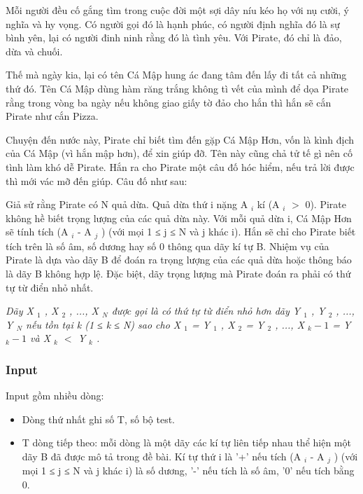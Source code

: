 



   Mỗi người đều cố gắng tìm trong cuộc đời một sợi dây níu kéo họ với nụ cười, ý nghĩa và hy vọng. Có người gọi đó là hạnh phúc, có người định nghĩa đó là sự bình yên, lại có người đinh ninh rằng đó là tình yêu. Với Pirate, đó chỉ là đảo, dừa và chuối.  

   Thế mà ngày kia, lại có tên Cá Mập hung ác đang tâm đến lấy đi tất cả những thứ đó. Tên Cá Mập dùng hàm răng trắng không tì vết của mình để dọa Pirate rằng trong vòng ba ngày nếu không giao giấy tờ đảo cho hắn thì hắn sẽ cắn Pirate như cắn Pizza.  

   Chuyện đến nước này, Pirate chỉ biết tìm đến gặp Cá Mập Hơn, vốn là kình địch của Cá Mập (vì hắn mập hơn), để xin giúp đỡ. Tên này cũng chả tử tế gì nên cố tình làm khó dễ Pirate. Hắn ra cho Pirate một câu đố hóc hiểm, nếu trả lời được thì mới vác mỡ đến giúp. Câu đố như sau:  

   Giả sử rằng Pirate có N quả dừa. Quả dừa thứ i nặng A   $_    i   $   kí (A   $_    i   $   $>$ 0). Pirate không hề biết trọng lượng của các quả dừa này. Với mỗi quả dừa i, Cá Mập Hơn sẽ tính tích (A   $_    i   $   - A   $_    j   $   ) (với mọi 1 ≤ j ≤ N và j khác i). Hắn sẽ chỉ cho Pirate biết tích trên là số âm, số dương hay số 0 thông qua dãy kí tự B. Nhiệm vụ của Pirate là dựa vào dãy B để đoán ra trọng lượng của các quả dừa hoặc thông báo là dãy B không hợp lệ. Đặc biệt, dãy trọng lượng mà Pirate đoán ra phải có thứ tự từ điển nhỏ nhất.  

\emph{    Dãy X    $_     1    $    , X    $_     2    $    , ..., X    $_     N    $    được gọi là có thứ tự từ điển nhỏ hơn dãy Y    $_     1    $    , Y    $_     2    $    , ..., Y    $_     N    $    nếu tồn tại k (1 ≤ k ≤ N) sao cho X    $_     1    $    = Y    $_     1    $    , X    $_     2    $    = Y    $_     2    $    , ..., X    $_     k - 1    $    = Y    $_     k - 1    $    và X    $_     k    $    $<$ Y    $_     k    $    .   }

\subsubsection{   Input  }

   Input gồm nhiều dòng:  
\begin{itemize}
	\item     Dòng thứ nhất ghi số T, số bộ test.   
	\item     T dòng tiếp theo: mỗi dòng là một dãy các kí tự liên tiếp nhau thể hiện một dãy B đã được mô tả trong đề bài. Kí tự thứ i là '+' nếu tích (A    $_     i    $    - A    $_     j    $    ) (với mọi 1 ≤ j ≤ N và j khác i) là số dương, '-' nếu tích là số âm, '0' nếu tích bằng 0.   
\end{itemize}

